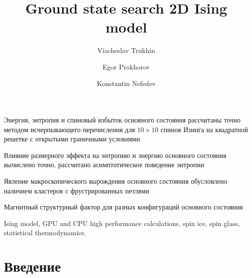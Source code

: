 \documentclass[utf8, babel, sor, jor, amsmath, amssymb, reprint]{elsarticle} %
\begin{document}
\begin{frontmatter}


\title{Ground state search 2D Ising model}

\author[mainaddress, secondaryaddress]{Viacheslav Trukhin}

\author[mainaddress]{Egor Prokhorov}

\author[mainaddress, secondaryaddress]{Konstantin Nefedev}


\address[mainaddress]{Far Eastern Federal University, Vladivostok, Russky Island, 10 Ajax Bay, 690922, the Russian Federation}
\address[secondaryaddress]{Institute of Applied Mathematics, Far Eastern Branch, Russian Academy of Science, Vladivostok, Radio 7, 690041, the Russian Federation}

\begin{abstract}


\end{abstract}


\begin{highlights}
	\item Энергия, энтропия и спиновый избыток основного состояния рассчитаны точно методом исчерпывающего перечисления для $10 \times 10$ спинов Изинга на квадратной решетке с открытыми граничными условиями
	\item Влияние размерного эффекта на энтропию и энергию основного состояния вычислено точно, рассчитано асимптотическое поведение энтропии
	\item Явление макроскопического вырождения основного состояния обусловлено наличием кластеров с фрустрированных петлями
	\item Магнитный структурный фактор для разных конфигураций основного состояния
\end{highlights}


\begin{keyword}
	Ising model, GPU and CPU high performance calculations, spin ice, spin glass, statistical thermodynamics.
\end{keyword}


\end{frontmatter}

\linenumbers
\newpage
\tableofcontents

\newpage
\section{Введение}
\end{document}
